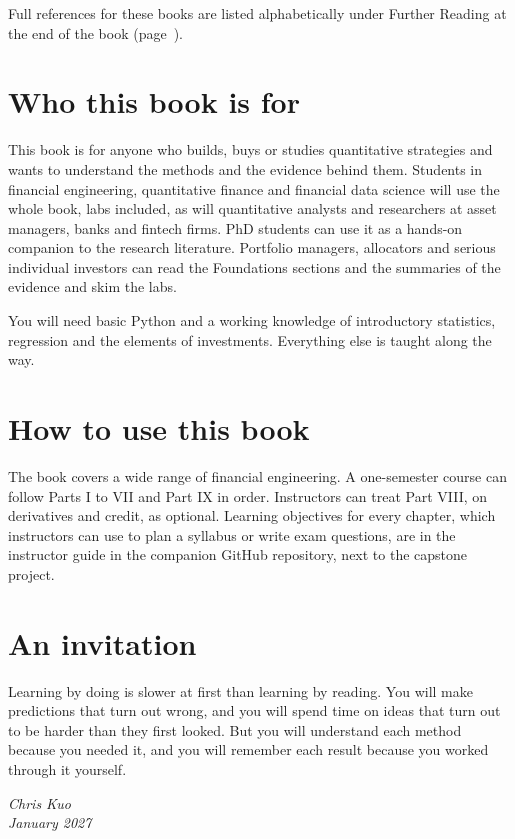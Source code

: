 \endgroup

Full references for these books are listed alphabetically under Further Reading at the end of the book (page~\pageref{furtherreading}).


\section*{Who this book is for}

This book is for anyone who builds, buys or studies quantitative strategies and wants to understand the methods and the evidence behind them.
Students in financial engineering, quantitative finance and financial data science will use the whole book, labs included, as will quantitative analysts and researchers at asset managers, banks and fintech firms.
PhD students can use it as a hands-on companion to the research literature. Portfolio managers, allocators and serious individual investors can read the Foundations sections and the summaries of the evidence and skim the labs.

You will need basic Python and a working knowledge of introductory statistics, regression and the elements of investments. Everything else is taught along the way.

\section*{How to use this book}

The book covers a wide range of financial engineering.
A one-semester course can follow Parts I to VII and Part IX in order. Instructors can treat Part VIII, on derivatives and credit, as optional. Learning objectives for every chapter, which instructors can use to plan a syllabus or write exam questions, are in the instructor guide in the companion GitHub repository, next to the capstone project.

\section*{An invitation}

Learning by doing is slower at first than learning by reading. You will make predictions that turn out wrong, and you will spend time on ideas that turn out to be harder than they first looked. But you will understand each method because you needed it, and you will remember each result because you worked through it yourself.


\bigskip
\begin{flushright}
\emph{Chris Kuo}\\
\emph{January 2027}
\end{flushright}
